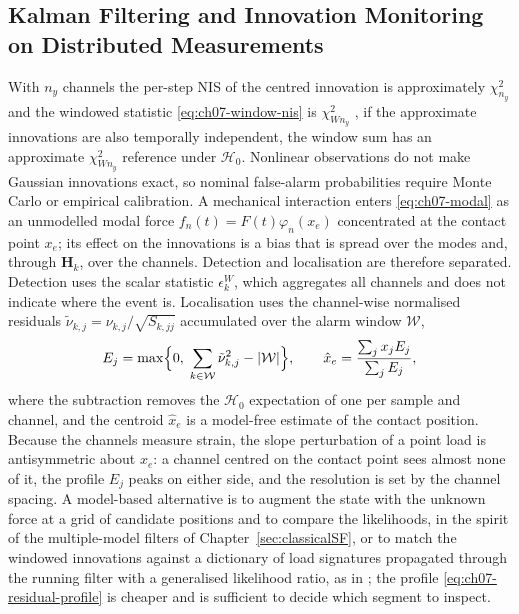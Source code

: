 \documentclass[graybox,envcountchap]{style/SNmono}
\providecommand{\DIFadd}[1]{{\protect\color{blue} #1}} %
\providecommand{\DIFdel}[1]{{\protect\color{red} #1}} %
\providecommand{\DIFaddbegin}{} %
\providecommand{\DIFaddend}{} %
\providecommand{\DIFdelbegin}{} %
\providecommand{\DIFdelend}{} %
\begin{document}
\subsection{Kalman Filtering and Innovation Monitoring on Distributed Measurements}
\label{subsec:cable-kf-monitoring}
With $n_y$ channels the per-step NIS of the centred innovation is approximately $\chi^{2}_{n_y}$ and\DIFdelbegin \DIFdel{the windowed statistic \eqref{eq:ch07-window-nis} is $\chi^{2}_{W n_y}$ }\DIFdelend \DIFaddbegin \DIFadd{, if the approximate innovations are also temporally independent, the window sum has an approximate $\chi^2_{Wn_y}$ reference }\DIFaddend under $\mathcal{H}_0$. \DIFaddbegin \DIFadd{Nonlinear observations do not make Gaussian innovations exact, so nominal false-alarm probabilities require Monte Carlo or empirical calibration. }\DIFaddend A mechanical interaction enters \eqref{eq:ch07-modal} as an unmodelled modal force $f_n(t)=F(t)\varphi_n(x_e)$ concentrated at the contact point $x_e$; its effect on the innovations is a bias that is spread over the modes and, through $\mathbf{H}_k$, over the channels. Detection and localisation are therefore separated. Detection uses the scalar statistic $\epsilon_k^{W}$, which aggregates all channels and does not indicate where the event is. Localisation uses the channel-wise normalised residuals $\tilde\nu_{k,j}=\nu_{k,j}/\sqrt{S_{k,jj}}$ accumulated over the alarm window $\mathcal{W}$,
\begin{equation}
E_j=\max\Bigl\{0,\;\sum_{k\in\mathcal{W}}\tilde\nu_{k,j}^{2}-|\mathcal{W}|\Bigr\},
\qquad
\hat x_e=\frac{\sum_j x_j E_j}{\sum_j E_j},
\label{eq:ch07-residual-profile}
\end{equation}
where the subtraction removes the $\mathcal{H}_0$ expectation of one per sample and channel, and the centroid $\hat x_e$ is a model-free estimate of the contact position. Because the channels measure strain, the slope perturbation of a point load is antisymmetric about $x_e$: a channel centred on the contact point sees almost none of it, the profile $E_j$ peaks on either side, and the resolution is set by the channel spacing. A model-based alternative is to augment the state with the unknown force at a grid of candidate positions and to compare the likelihoods, in the spirit of the multiple-model filters of Chapter~\ref{sec:classicalSF}, or to match the windowed innovations against a dictionary of load signatures propagated through the running filter with a generalised likelihood ratio, as in \cite{oliva_quadratic_ejc_2026}; the profile \eqref{eq:ch07-residual-profile} is cheaper and is sufficient to decide which segment to inspect.
\end{document}
